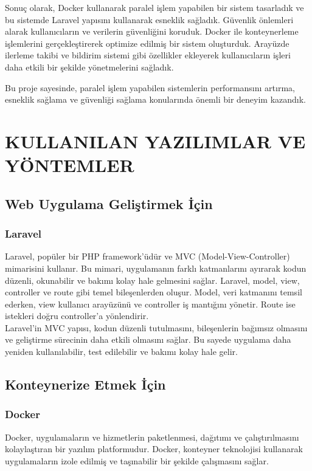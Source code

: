 Sonuç olarak, Docker kullanarak paralel işlem yapabilen bir sistem tasarladık ve bu sistemde Laravel yapısını kullanarak esneklik sağladık. Güvenlik önlemleri alarak kullanıcıların ve verilerin güvenliğini koruduk. Docker ile konteynerleme işlemlerini gerçekleştirerek optimize edilmiş bir sistem oluşturduk. Arayüzde ilerleme takibi ve bildirim sistemi gibi özellikler ekleyerek kullanıcıların işleri daha etkili bir şekilde yönetmelerini sağladık.

Bu proje sayesinde, paralel işlem yapabilen sistemlerin performansını artırma, esneklik sağlama ve güvenliği sağlama konularında önemli bir deneyim kazandık.
\section{KULLANILAN YAZILIMLAR VE YÖNTEMLER}

\subsection{Web Uygulama Geliştirmek İçin}
\subsubsection{Laravel }
Laravel, popüler bir PHP framework'üdür ve MVC (Model-View-Controller) mimarisini kullanır. Bu mimari, uygulamanın farklı katmanlarını ayırarak kodun düzenli, okunabilir ve bakımı kolay hale gelmesini sağlar. Laravel, model, view, controller ve route gibi temel bileşenlerden oluşur. Model, veri katmanını temsil ederken, view kullanıcı arayüzünü ve controller iş mantığını yönetir. Route ise istekleri doğru controller'a yönlendirir.\\

Laravel'in MVC yapısı, kodun düzenli tutulmasını, bileşenlerin bağımsız olmasını ve geliştirme sürecinin daha etkili olmasını sağlar. Bu sayede uygulama daha yeniden kullanılabilir, test edilebilir ve bakımı kolay hale gelir.

\subsection{Konteynerize Etmek İçin  }
\subsubsection{Docker}
Docker, uygulamaların ve hizmetlerin paketlenmesi, dağıtımı ve çalıştırılmasını kolaylaştıran bir yazılım platformudur. Docker, konteyner teknolojisi kullanarak uygulamaların izole edilmiş ve taşınabilir bir şekilde çalışmasını sağlar.

